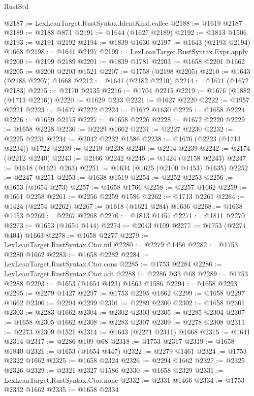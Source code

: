 \begin{lexlean}{RustStd}
\begin{coremodule}
@2187 := LexLeanTarget.RustSyntax.IdentKind.callee
@2188 := @1619 @2187
@2189 := @2188 @871
@2191 := @1644 (@1627 @2189)
@2192 := @1813 @1506
@2193 := @2191 @2192
@2194 := @1839 @1630
@2197 := @1643 (@2193 @2194) @1668
@2198 := @1641 @2197
@2199 := LexLeanTarget.RustSyntax.Expr.apply
@2200 := @2199 @2189
@2201 := @1839 @1781
@2203 := @1658 @2201 @1662
@2205 := @2200 @2203 @1521
@2207 := @1758 (@2198 @2205)
@2210 := @1643 (@2186 @2207) @1668
@2212 := @1641 (@2182 @2210)
@2214 := @1671 (@1672 @2183)
@2215 := @2170 @2135
@2216 := @1704 @2215
@2219 := @1676 (@1882 (@1713 @2216))
@2220 := @1629 @233
@2221 := @1627 @2220
@2222 := @1957 @2221
@2223 := @1677 @2222
@2224 := @1672 @1630
@2225 := @1658 @2224
@2226 := @1659 @2175
@2227 := @1658 @2226
@2228 := @1672 @2220
@2229 := @1658 @2228
@2230 := @2229 @1662
@2231 := @2227 @2230
@2232 := @2225 @2231
@2234 := @2042 @2232 @1586
@2238 := @1676 (@2223 (@1713 @2234)) @1722
@2239 := @2219 @2238
@2240 := @2214 @2239
@2242 := @2174 (@2212 @2240)
@2243 := @2166 @2242
@2245 := @1424 (@2158 @2243)
@2247 := @1618 (@1621 @263)
@2251 := @1634 (@1625 (@2100 @1453) @1635)
@2252 := @2247 @2251
@2253 := @1638 @1519
@2254 := @2252 @2253
@2256 := @1653 (@1654 @273)
@2257 := @1658 @1766
@2258 := @2257 @1662
@2259 := @1661 @2258
@2261 := @2256 @2259 @1586
@2262 := @1713 @2261
@2264 := @1424 (@2254 @2262)
@2267 := @1618 (@1621 @284) @1636
@2268 := @1638 @1453
@2269 := @2267 @2268
@2270 := @1813 @1457
@2271 := @1811 @2270
@2273 := @1653 (@1654 @144)
@2274 := @2043 @109
@2277 := @1753 (@2274 @404) @1663
@2278 := @1658 @2277
@2279 := LexLeanTarget.RustSyntax.Ctor.nil
@2280 := @2279 @1456
@2282 := @1753 @2280 @1662
@2283 := @1658 @2282
@2284 := LexLeanTarget.RustSyntax.Ctor.cons
@2285 := @1753 @2284
@2286 := LexLeanTarget.RustSyntax.Ctor.adt
@2288 := @2286 @33 @68
@2289 := @1753 @2288
@2293 := @1653 (@1654 @423) @1663 @1586
@2294 := @1658 @2293
@2295 := @2279 @1427
@2297 := @1753 @2295 @1662
@2299 := @1658 @2297 @1662
@2300 := @2294 @2299
@2301 := @2289 @2300
@2302 := @1658 @2301
@2303 := @2283 @1662
@2304 := @2302 @2303
@2305 := @2285 @2304
@2307 := @1658 @2305 @1662
@2308 := @2283 @2307
@2309 := @2278 @2308
@2311 := @2273 @2309 @1521
@2314 := @1643 (@2271 @2311) @1668
@2315 := @1641 @2314
@2317 := @2286 @109 @68
@2318 := @1753 @2317
@2319 := @1658 @1840
@2321 := @1653 (@1654 @447)
@2322 := @2279 @1461
@2324 := @1753 @2322 @1662
@2325 := @1658 @2324
@2326 := @2294 @1662
@2327 := @2325 @2326
@2329 := @2321 @2327 @1586
@2330 := @1658 @2329
@2331 := LexLeanTarget.RustSyntax.Ctor.none
@2332 := @2331 @1466
@2334 := @1753 @2332 @1662
@2335 := @1658 @2334

\end{coremodule}
\end{lexlean}
